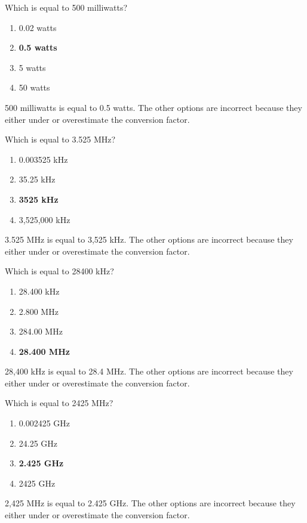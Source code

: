 \begin{tcolorbox}[colback=gray!10!white,colframe=black!75!black,title={T5B05}]
    Which is equal to 500 milliwatts?
    \begin{enumerate}[label=\Alph*),noitemsep]
        \item 0.02 watts
        \item \textbf{0.5 watts}
        \item 5 watts
        \item 50 watts
    \end{enumerate}
\end{tcolorbox}
500 milliwatts is equal to 0.5 watts. The other options are incorrect because they either under or overestimate the conversion factor.

\begin{tcolorbox}[colback=gray!10!white,colframe=black!75!black,title={T5B07}]
    Which is equal to 3.525 MHz?
    \begin{enumerate}[label=\Alph*),noitemsep]
        \item 0.003525 kHz
        \item 35.25 kHz
        \item \textbf{3525 kHz}
        \item 3,525,000 kHz
    \end{enumerate}
\end{tcolorbox}
3.525 MHz is equal to 3,525 kHz. The other options are incorrect because they either under or overestimate the conversion factor.

\begin{tcolorbox}[colback=gray!10!white,colframe=black!75!black,title={T5B12}]
    Which is equal to 28400 kHz?
    \begin{enumerate}[label=\Alph*),noitemsep]
        \item 28.400 kHz
        \item 2.800 MHz
        \item 284.00 MHz
        \item \textbf{28.400 MHz}
    \end{enumerate}
\end{tcolorbox}
28,400 kHz is equal to 28.4 MHz. The other options are incorrect because they either under or overestimate the conversion factor.

\begin{tcolorbox}[colback=gray!10!white,colframe=black!75!black,title={T5B13}]
    Which is equal to 2425 MHz?
    \begin{enumerate}[label=\Alph*),noitemsep]
        \item 0.002425 GHz
        \item 24.25 GHz
        \item \textbf{2.425 GHz}
        \item 2425 GHz
    \end{enumerate}
\end{tcolorbox}
2,425 MHz is equal to 2.425 GHz. The other options are incorrect because they either under or overestimate the conversion factor.

